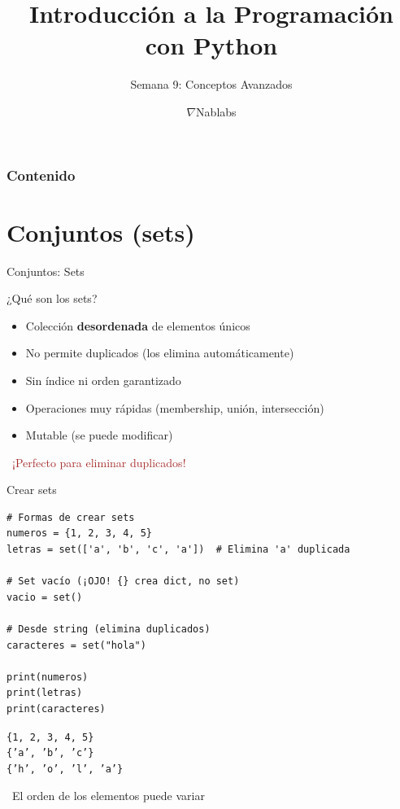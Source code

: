 \documentclass{beamer}
\title{\textbf{Introducción a la Programación con Python}}
\subtitle{Semana 9: Conceptos Avanzados}
\author{$\nabla$Nablabs}
\date{}
\begin{document}
\begin{frame}
\titlepage
\end{frame}

\begin{frame}
\frametitle{Contenido}
\tableofcontents
\end{frame}

\section{Conjuntos (sets)}

\begin{frame}{Conjuntos: Sets \faObjectGroup}
\begin{conceptbox}{¿Qué son los sets?}
\small
\begin{itemize}
    \item[\faCircle] Colección \textbf{desordenada} de elementos únicos
    \item[\faCheckDouble] No permite duplicados (los elimina automáticamente)
    \item[\faRandom] Sin índice ni orden garantizado
    \item[\faRocket] Operaciones muy rápidas (membership, unión, intersección)
    \item[\faEdit] Mutable (se puede modificar)
\end{itemize}
\end{conceptbox}

\vspace{0.2cm}
\begin{center}
\large\textcolor{brown}{\faLightbulb\ ¡Perfecto para eliminar duplicados!}
\end{center}
\end{frame}

\begin{frame}[fragile]{Crear sets \faPlus}
\begin{lstlisting}
# Formas de crear sets
numeros = {1, 2, 3, 4, 5}
letras = set(['a', 'b', 'c', 'a'])  # Elimina 'a' duplicada

# Set vacío (¡OJO! {} crea dict, no set)
vacio = set()

# Desde string (elimina duplicados)
caracteres = set("hola")

print(numeros)
print(letras)
print(caracteres)
\end{lstlisting}

\vspace{-0.2cm}
\begin{tcolorbox}[colback=green!10,colframe=green,title={\small\faArrowCircleRight \ Salida},coltitle=fg0,left=3pt,right=3pt,top=2pt,bottom=2pt,boxsep=1pt]
\small\texttt{\{1, 2, 3, 4, 5\}\\
\{'a', 'b', 'c'\}\\
\{'h', 'o', 'l', 'a'\}}
\end{tcolorbox}

\vspace{-0.1cm}
\begin{notebox}
\small\faExclamationTriangle\ El orden de los elementos puede variar
\end{notebox}
\end{frame}
\end{document}

